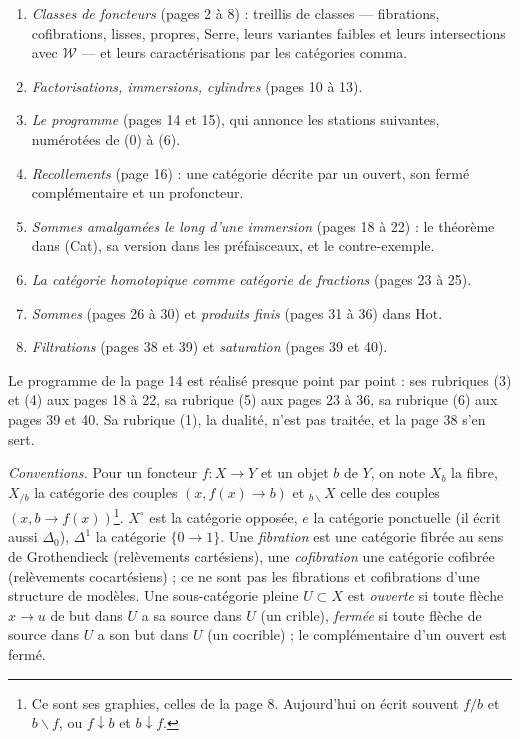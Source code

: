 \documentclass[11pt,a4paper]{article}
\begin{document}
\begin{enumerate}
\item[1.] \emph{Classes de foncteurs} (pages 2 à 8) : treillis de classes ---
fibrations, cofibrations, lisses, propres, Serre, leurs variantes faibles et
leurs intersections avec $\mathcal{W}$ --- et leurs caractérisations par les
catégories comma.
\item[2.] \emph{Factorisations, immersions, cylindres} (pages 10 à 13).
\item[3.] \emph{Le programme} (pages 14 et 15), qui annonce les stations
suivantes, numérotées de (0) à (6).
\item[4.] \emph{Recollements} (page 16) : une catégorie décrite par un ouvert,
son fermé complémentaire et un profoncteur.
\item[5.] \emph{Sommes amalgamées le long d'une immersion} (pages 18 à 22) :
le théorème dans (Cat), sa version dans les préfaisceaux, et le
contre-exemple.
\item[6.] \emph{La catégorie homotopique comme catégorie de fractions} (pages
23 à 25).
\item[7.] \emph{Sommes} (pages 26 à 30) et \emph{produits finis} (pages 31 à
36) dans $\mathrm{Hot}$.
\item[8.] \emph{Filtrations} (pages 38 et 39) et \emph{saturation} (pages 39
et 40).
\end{enumerate}

Le programme de la page 14 est réalisé presque point par point : ses rubriques
(3) et (4) aux pages 18 à 22, sa rubrique (5) aux pages 23 à 36, sa rubrique
(6) aux pages 39 et 40. Sa rubrique (1), la dualité, n'est pas traitée, et la
page 38 s'en sert.

\emph{Conventions.} Pour un foncteur $f : X \to Y$ et un objet $b$ de $Y$, on
note $X_{b}$ la fibre, $X_{/b}$ la catégorie des couples $(x, f(x) \to b)$ et
${}_{b\backslash}X$ celle des couples $(x, b \to f(x))$\footnote{Ce sont ses
graphies, celles de la page 8. Aujourd'hui on écrit souvent $f/b$ et $b\backslash
f$, ou $f \downarrow b$ et $b \downarrow f$.}. $X^{\circ}$ est la catégorie
opposée, $e$ la catégorie ponctuelle (il écrit aussi $\Delta_{0}$), $\Delta^{1}$
la catégorie $\{0 \to 1\}$. Une \emph{fibration} est une catégorie fibrée au
sens de Grothendieck (relèvements cartésiens), une \emph{cofibration} une
catégorie cofibrée (relèvements cocartésiens) ; ce ne sont pas les fibrations
et cofibrations d'une structure de modèles. Une sous-catégorie pleine
$U \subset X$ est \emph{ouverte} si toute flèche $x \to u$ de but dans $U$ a sa
source dans $U$ (un crible), \emph{fermée} si toute flèche de source dans $U$ a
son but dans $U$ (un cocrible) ; le complémentaire d'un ouvert est fermé.
\end{document}
